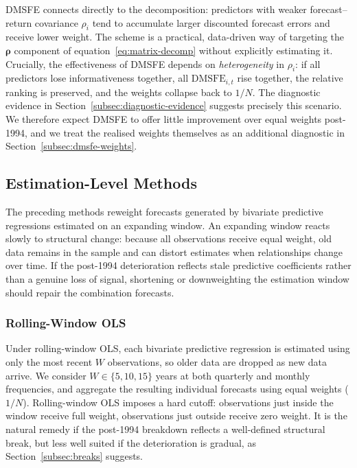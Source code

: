\documentclass[a4paper,11pt]{article}
\begin{document}
DMSFE connects directly to the decomposition: predictors with weaker
forecast--return covariance $\rho_i$ tend to accumulate larger discounted
forecast errors and receive lower weight. The scheme is a practical,
data-driven way of targeting the $\boldsymbol{\rho}$ component of
equation~\eqref{eq:matrix-decomp} without explicitly estimating it.
Crucially, the effectiveness of DMSFE depends on \emph{heterogeneity} in
$\rho_i$: if all predictors lose informativeness together, all
$\mathrm{DMSFE}_{i,t}$ rise together, the relative ranking is preserved,
and the weights collapse back to $1/N$. The diagnostic evidence in
Section~\ref{subsec:diagnostic-evidence} suggests precisely this
scenario. We therefore expect DMSFE to offer little improvement over
equal weights post-1994, and we treat the realised weights themselves as
an additional diagnostic in Section~\ref{subsec:dmsfe-weights}.

\subsection{Estimation-Level Methods}

The preceding methods reweight forecasts generated by bivariate
predictive regressions estimated on an expanding window. An expanding
window reacts slowly to structural change: because all observations
receive equal weight, old data remains in the sample and can distort
estimates when relationships change over time. If the post-1994
deterioration reflects stale predictive coefficients rather than a
genuine loss of signal, shortening or downweighting the estimation
window should repair the combination forecasts.

\subsubsection{Rolling-Window OLS}\label{subsubsec:rolling}

Under rolling-window OLS, each bivariate predictive regression is
estimated using only the most recent $W$ observations, so older data are
dropped as new data arrive. We consider $W \in \{5, 10, 15\}$ years at
both quarterly and monthly frequencies, and aggregate the resulting
individual forecasts using equal weights ($1/N$). Rolling-window OLS
imposes a hard cutoff: observations just inside the window receive full
weight, observations just outside receive zero weight. It is the natural
remedy if the post-1994 breakdown reflects a well-defined structural
break, but less well suited if the deterioration is gradual, as
Section~\ref{subsec:breaks} suggests.
\end{document}
